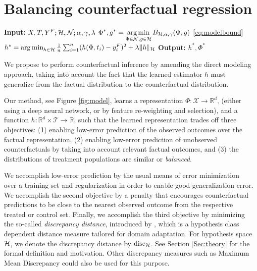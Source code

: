 \section{Balancing counterfactual regression}\label{Sec:model}
\begin{algorithm}[tbp]
\caption{Balancing counterfactual regression}
\label{alg:model}
\begin{algorithmic}[1]
  \STATE \textbf{Input:} $X, T, Y^F; \mathcal{H}, \mathcal{N}; \alpha, \gamma, \lambda$
  \STATE $\displaystyle \Phi^*, g^* = \operatorname*{arg\,min}_{\Phi\in \mathcal{N}, g\in \mathcal{H}} B_{\mathcal{H}, \alpha, \gamma}(\Phi, g)$ \;\;\; \eqref{eq:modelbound}
  \vspace{0.1em}
  \STATE $h^* = \operatorname*{arg\,min}_{h \in \mathcal{H}} \frac{1}{n}\sum_{i=1}^n(h(\Phi,t_i) - y^F_i)^2 + \lambda\|h\|_{\mathcal{H}} $
  \vspace{0.2em}
  \STATE \textbf{Output:} $h^*, \Phi^*$
\end{algorithmic}
\end{algorithm}
\vskip -5pt
We propose to perform counterfactual inference by amending the direct modeling approach, taking into account the fact that the learned estimator $h$ must generalize from the factual distribution to the counterfactual distribution.

Our method, see Figure \ref{fig:model}, learns a representation $\Phi : \mathcal{X} \rightarrow \mathbb{R}^d$, (either using a deep neural network, or by feature re-weighting and selection), and a function $h : \mathbb{R}^d \times \mathcal{T} \rightarrow \mathbb{R}$, such that the learned representation trades off three objectives: (1) enabling low-error prediction of the observed outcomes over the factual representation, (2) enabling low-error prediction of unobserved counterfactuals by taking into account relevant factual outcomes, and (3) the distributions of treatment populations are similar or \emph{balanced}.

We accomplish low-error prediction by the usual means of error minimization over a training set and regularization in order to enable good generalization error. We accomplish the second objective by a penalty  that encourages counterfactual predictions to be close to the nearest observed outcome from the respective treated or control set. Finally, we accomplish the third objective by minimizing the so-called \emph{discrepancy distance}, introduced by \citet{mansour2009domain}, which is a hypothesis class dependent distance measure tailored for domain adaptation. For hypothesis space $\mathcal{H}$, we denote the discrepancy distance by $\operatorname*{disc}_{\mathcal{H}}$. See Section \ref{Sec:theory} for the formal definition and motivation. Other discrepancy measures such as Maximum Mean Discrepancy \citep{gretton2012mmd} could also be used for this purpose. 

